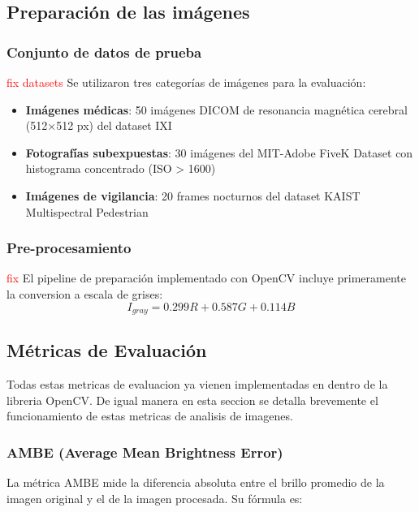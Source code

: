 \documentclass[sigchi]{acmart}
\newcommand{\rojo}[1]{\textcolor{red}{#1}}
\begin{document}
\subsection{Preparación de las imágenes}
\label{subsec:preparacion}

\subsubsection{Conjunto de datos de prueba}
\rojo{fix datasets}
Se utilizaron tres categorías de imágenes para la evaluación:

\begin{itemize}
	\item \textbf{Imágenes médicas}: 50 imágenes DICOM de resonancia magnética cerebral (512×512 px) del dataset IXI \cite{ixi_dataset}
	\item \textbf{Fotografías subexpuestas}: 30 imágenes del MIT-Adobe FiveK Dataset \cite{fivek_dataset} con histograma concentrado (ISO > 1600)
	\item \textbf{Imágenes de vigilancia}: 20 frames nocturnos del dataset KAIST Multispectral Pedestrian \cite{kaist_dataset}
\end{itemize}

\subsubsection{Pre-procesamiento}
\rojo{fix}
El pipeline de preparación implementado con OpenCV incluye primeramente la conversion a escala
de grises:
\begin{equation}
	I_{gray} = 0.299R + 0.587G + 0.114B
\end{equation}

\subsection{Métricas de Evaluación}

Todas estas metricas de evaluacion ya vienen implementadas en dentro de la libreria OpenCV. De igual manera
en esta seccion se detalla brevemente el funcionamiento de estas metricas de analisis de imagenes.

\subsubsection{AMBE (Average Mean Brightness Error)}
La métrica AMBE mide la diferencia absoluta entre el brillo promedio de la imagen original y el
de la imagen procesada. Su fórmula es:
\end{document}
